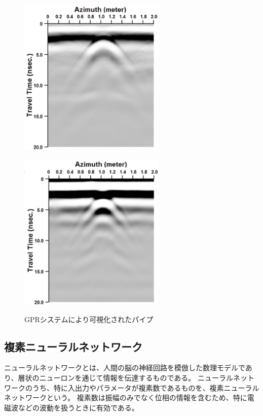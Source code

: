 \documentclass[11pt,a4paper,uplatex]{ujarticle}
\begin{document}
    \begin{figure}[tbp]
      \centering
      \begin{minipage}[b]{0.495\textwidth}
        \centering
        \includegraphics[keepaspectratio, width=70mm]{Images/SFCW_Kido.png}
        \label{SFCW_Kido}
      \end{minipage}
      \begin{minipage}[b]{0.495\textwidth}
        \centering
        \includegraphics[keepaspectratio, width=70mm]{Images/pulse_Kido.png}
        \label{pulse_Kido}
      \end{minipage}
      \caption{GPRシステムにより可視化されたパイプ\cite{STFW_Kido}}\label{fig:GPR_raw_data}
    \end{figure}

  \subsection{複素ニューラルネットワーク}

    ニューラルネットワークとは、人間の脳の神経回路を模倣した数理モデルであり、層状のニューロンを通じて情報を伝達するものである。
    ニューラルネットワークのうち、特に入出力やパラメータが複素数であるものを、複素ニューラルネットワークという。
    複素数は振幅のみでなく位相の情報を含むため、特に電磁波などの波動を扱うときに有効である\cite{CVNN}。
\end{document}
